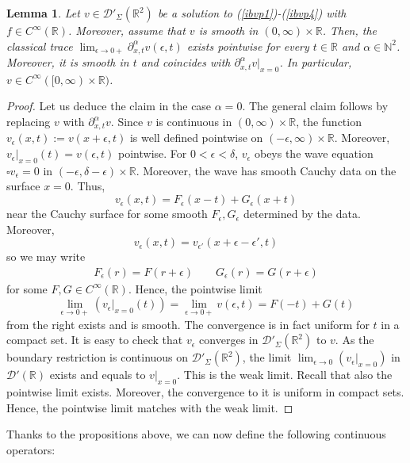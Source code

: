 \documentclass[10pt,a4paper]{article}
\theoremstyle{plain}
\newtheorem{lemma}[theorem]{Lemma}
\theoremstyle{definition}
\theoremstyle{remark}
\numberwithin{equation}{section}
\newcommand{\R}{\mathbb{R}}
\newcommand{\N}{\mathbb{N}}
\begin{document}
\begin{lemma}\label{ooiiqweh}
Let $v \in \mathcal{D}'_\Sigma(\R^2)$ be a solution to (\ref{ibvp1})-(\ref{ibvp4}) with $f\in C^\infty(\R)$. Moreover, assume that $v$ is  smooth in  $  (0,\infty) \times \R $.
Then, the classical trace  $\lim_{\epsilon \to 0+}  \partial_{x,t}^\alpha v(\epsilon,t)$ exists pointwise for every $t \in \R$ and $\alpha \in \N^2$. Moreover, it is smooth in $t$ and coincides with 
$ \partial_{x,t}^\alpha  v|_{x=0}   $. 
In particular, $ v \in C^\infty  ( [0,\infty) \times \R )$. 

\end{lemma}
\begin{proof}
Let us deduce the claim in the case  $\alpha = 0$. The general claim follows by replacing $v$ with $\partial_{x,t}^\alpha v$. 
Since $v$  is continuous in $(0,\infty) \times \R$, the function $v_\epsilon(x,t) := v(x+\epsilon,t) $ is well defined pointwise on $(-\epsilon,\infty) \times \R$. Moreover, $v_\epsilon|_{x=0} (t) = v(\epsilon,t)$ pointwise. 
For $0 < \epsilon < \delta $, 
$v_\epsilon $ obeys the wave equation 
$\square v_\epsilon  = 0$ in $(-\epsilon, \delta- \epsilon) \times \R $. Moreover, the wave has smooth Cauchy data on the surface $x=0$. Thus, 
\[
v_\epsilon(x,t) = F_\epsilon( x-t) + G_\epsilon( x+t)
\]
near the Cauchy surface 
for some smooth $F_\epsilon,G_\epsilon$ determined by the data. Moreover, 
\[
v_{\epsilon}(x,t) =v_{\epsilon'} (x+ \epsilon-\epsilon',t) 
\]
so we may write 
\begin{align}
F_\epsilon(  r ) = F (  r + \epsilon ) 
\quad \quad 
G_\epsilon(  r ) = G (  r + \epsilon ) 
\end{align}
for some $F,G \in C^\infty(\R)  $. 
Hence, the pointwise limit 
\[
\lim_{\epsilon \to 0+} ( v_\epsilon|_{x=0} (t) )= \lim_{\epsilon \to 0+} v(\epsilon,t) = F(-t) + G(t)
\]
from the right  
exists and is smooth. The convergence is in fact uniform for $t $ in a compact set. 
It  is easy to check that  $v_\epsilon$
converges in $\mathcal{D}'_\Sigma(\R^2)$
to $v$. 
 As the boundary restriction is continuous on  $\mathcal{D}'_\Sigma (\R^2)$, the limit $ \lim_{\epsilon \to 0} ( v_\epsilon|_{x=0} ) $ in $\mathcal{D}'(\R) $
exists and equals to $v|_{x=0}$. 
This is the weak limit. 
Recall that also the pointwise limit exists. Moreover, the convergence to it is uniform in compact sets. Hence, the pointwise limit matches with the weak limit. 
\end{proof}



Thanks to the propositions above, we can now define the following continuous operators:
\end{document}
